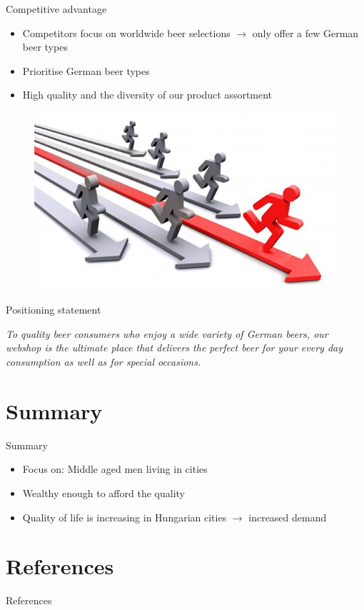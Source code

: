 \documentclass[aspectratio=43]{beamer}
\begin{document}
\begin{frame}{Competitive advantage}
\begin{itemize}
   \item Competitors focus on worldwide beer selections $\rightarrow$ only offer a few German beer types
   \item Prioritise German beer types
   \item High quality and the diversity of our product assortment
\end{itemize}
\begin{figure}[H]
  \centering
  \includegraphics[width=0.57\linewidth]{pics/bullshit3.jpg}
\end{figure}
\end{frame}

\begin{frame}{Positioning statement}

      \textit{To quality beer consumers who enjoy a wide variety of German beers, our webshop is the ultimate place that delivers the perfect beer for your every day consumption as well as for special occasions.}

\end{frame}






\section{Summary}

\begin{frame}{Summary}
\begin{itemize}
   \item Focus on: Middle aged men living in cities
   \item Wealthy enough to afford the quality
   \item Quality of life is increasing in Hungarian cities $\rightarrow$ increased demand
\end{itemize}
\end{frame}


\section{References}
\begin{frame}{References}
   \begin{columns}
      \begin{column}{0.9\textwidth}

         \printbibliography[heading=none]
      \end{column}
   \end{columns}

\end{frame}
\end{document}
